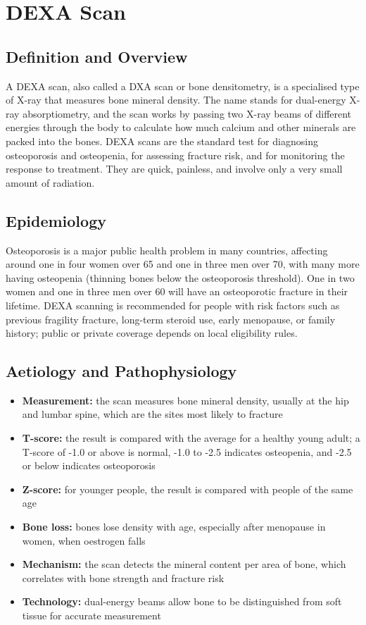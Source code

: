 \chapter{DEXA Scan}

\section*{Definition and Overview}
A DEXA scan, also called a DXA scan or bone densitometry, is a specialised type of X-ray that measures bone mineral density. The name stands for dual-energy X-ray absorptiometry, and the scan works by passing two X-ray beams of different energies through the body to calculate how much calcium and other minerals are packed into the bones. DEXA scans are the standard test for diagnosing osteoporosis and osteopenia, for assessing fracture risk, and for monitoring the response to treatment. They are quick, painless, and involve only a very small amount of radiation.

\section*{Epidemiology}
Osteoporosis is a major public health problem in many countries, affecting around one in four women over 65 and one in three men over 70, with many more having osteopenia (thinning bones below the osteoporosis threshold). One in two women and one in three men over 60 will have an osteoporotic fracture in their lifetime. DEXA scanning is recommended for people with risk factors such as previous fragility fracture, long-term steroid use, early menopause, or family history; public or private coverage depends on local eligibility rules.

\section*{Aetiology and Pathophysiology}
\begin{itemize}
    \item \textbf{Measurement:} the scan measures bone mineral density, usually at the hip and lumbar spine, which are the sites most likely to fracture
    \item \textbf{T-score:} the result is compared with the average for a healthy young adult; a T-score of -1.0 or above is normal, -1.0 to -2.5 indicates osteopenia, and -2.5 or below indicates osteoporosis
    \item \textbf{Z-score:} for younger people, the result is compared with people of the same age
    \item \textbf{Bone loss:} bones lose density with age, especially after menopause in women, when oestrogen falls
    \item \textbf{Mechanism:} the scan detects the mineral content per area of bone, which correlates with bone strength and fracture risk
    \item \textbf{Technology:} dual-energy beams allow bone to be distinguished from soft tissue for accurate measurement
\end{itemize}

